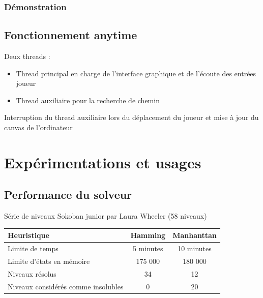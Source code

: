 \documentclass{beamer}
\begin{document}
\begin{frame}
\frametitle{Démonstration}
\end{frame}

\subsection{Fonctionnement anytime}
\begin{frame}
Deux threads :
\begin{itemize}
\item Thread principal en charge de l'interface graphique et de l'écoute des entrées joueur
\item Thread auxiliaire pour la recherche de chemin
\end{itemize}
Interruption du thread auxiliaire lors du déplacement du joueur et mise à jour du canvas de l'ordinateur
\end{frame}

\section{Expérimentations et usages}
\subsection{Performance du solveur}
\begin{frame}
  Série de niveaux Sokoban junior par Laura Wheeler (58 niveaux)\\
  \centering
  \begin{tabular}{|l|c|c|}
  \hline
  Heuristique                          & Hamming   & Manhanttan \\
  \hline
  Limite de temps                      & 5 minutes & 10 minutes \\
  \hline
  Limite d'états en mémoire            & 175 000   & 180 000    \\
  \hline
  Niveaux résolus                      &    34     &    12      \\
  \hline
  Niveaux considérés comme insolubles  &    0      &    20      \\
  \hline  
  \end{tabular}
\end{frame}
\end{document}
